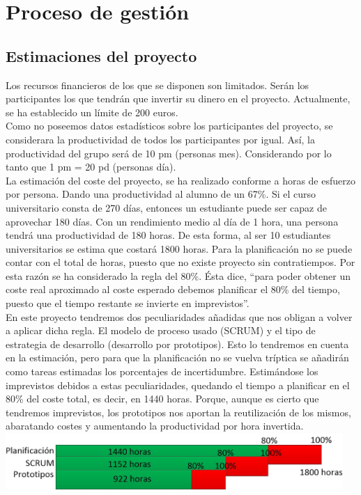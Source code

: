 \chapter{Proceso de gestión}
\section{Estimaciones del proyecto}
Los recursos financieros de los que se disponen son limitados. Serán los participantes los que tendrán que invertir su dinero en el proyecto. Actualmente, se ha establecido un límite de 200 euros.\\

Como no poseemos datos estadísticos sobre los participantes del proyecto, se considerara la productividad de todos los participantes por igual. Así, la productividad del grupo será de 10 pm (personas mes). Considerando por lo tanto que 1 pm = 20 pd (personas día).\\

La estimación del coste del proyecto, se ha realizado conforme a horas de esfuerzo por persona.  Dando una productividad al alumno de un 67\%. Si el curso universitario consta de 270 días, entonces un estudiante puede ser capaz de aprovechar 180 días. Con un rendimiento medio al día de 1 hora, una persona tendrá una productividad de 180 horas. De esta forma, al ser 10 estudiantes universitarios se estima que costará 1800 horas. Para la planificación no se puede contar con el total de horas, puesto que no existe proyecto sin contratiempos. Por esta razón se ha considerado la regla del 80\%. Ésta dice, ``para poder obtener un coste real aproximado al coste esperado debemos planificar el 80\% del tiempo, puesto que el tiempo restante se invierte en imprevistos''.\\

En este proyecto tendremos dos peculiaridades añadidas que nos obligan a volver a aplicar dicha regla. El modelo de proceso usado (SCRUM) y el tipo de estrategia de desarrollo (desarrollo por prototipos). Esto lo tendremos en cuenta en la estimación, pero para que la planificación no se vuelva tríptica se añadirán como tareas estimadas los porcentajes de incertidumbre. Estimándose los imprevistos debidos a estas peculiaridades, quedando el tiempo a planificar en el 80\% del coste total, es decir, en 1440 horas. Porque, aunque es cierto que tendremos imprevistos, los prototipos nos aportan la reutilización de los mismos, abaratando costes y aumentando la productividad por hora invertida. 
  \includegraphics[width=0.96\textwidth]{2.GestionYPlanificacion/estimacion.jpg}

